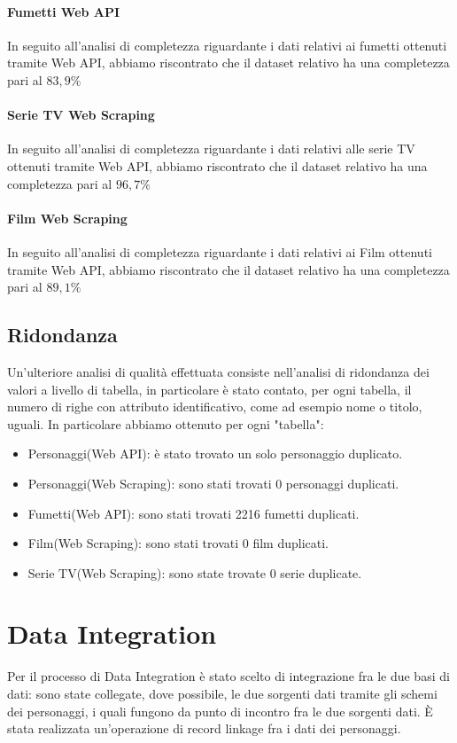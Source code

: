 \documentclass[
12pt, %
a4paper, %
oneside, %
headinclude,footinclude, %
BCOR5mm, %
]{scrartcl}
\begin{document}
\paragraph{Fumetti Web API}
In seguito all'analisi di completezza riguardante i dati relativi ai fumetti ottenuti tramite Web API, abbiamo riscontrato che il dataset relativo ha una completezza pari al $83,9 \%$
\paragraph{Serie TV Web Scraping}
In seguito all'analisi di completezza riguardante i dati relativi alle serie TV ottenuti tramite Web API, abbiamo riscontrato che il dataset relativo ha una completezza pari al $96,7 \%$
\paragraph{Film Web Scraping}
In seguito all'analisi di completezza riguardante i dati relativi ai Film ottenuti tramite Web API, abbiamo riscontrato che il dataset relativo ha una completezza pari al $89,1 \%$
\subsection{Ridondanza}
Un'ulteriore analisi di qualità effettuata consiste nell'analisi di ridondanza dei valori a livello di tabella, in particolare è stato contato, per ogni tabella, il numero di righe con attributo identificativo, come ad esempio nome o titolo, uguali.
In particolare abbiamo ottenuto per ogni "tabella":
\begin{itemize}
    \item Personaggi(Web API): è stato trovato un solo personaggio duplicato.
    \item Personaggi(Web Scraping): sono stati trovati 0 personaggi duplicati.
    \item Fumetti(Web API): sono stati trovati 2216 fumetti duplicati.
    \item Film(Web Scraping): sono stati trovati 0 film duplicati.
    \item Serie TV(Web Scraping): sono state trovate 0 serie duplicate.
\end{itemize}
\section{Data Integration}
Per il processo di Data Integration è stato scelto di integrazione fra le due basi di dati: sono state collegate, dove possibile, le due sorgenti dati tramite gli schemi dei personaggi, i quali fungono da punto di incontro fra le due sorgenti dati. È stata realizzata un'operazione di record linkage fra i dati dei personaggi.
\end{document}
